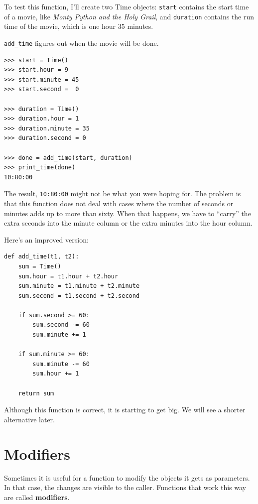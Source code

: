 \documentclass[10pt]{book}
\begin{document}
{

To test this function, I'll create two Time objects: {\tt start}
contains the start time of a movie, like {\em Monty Python and the
Holy Grail}, and {\tt duration} contains the run time of the movie,
which is one hour 35 minutes.


\verb"add_time" figures out when the movie will be done.

\beforeverb
\begin{verbatim}
>>> start = Time()
>>> start.hour = 9
>>> start.minute = 45
>>> start.second =  0

>>> duration = Time()
>>> duration.hour = 1
>>> duration.minute = 35
>>> duration.second = 0

>>> done = add_time(start, duration)
>>> print_time(done)
10:80:00
\end{verbatim}
\afterverb
%
The result, {\tt 10:80:00} might not be what you were hoping
for.  The problem is that this function does not deal with cases where the
number of seconds or minutes adds up to more than sixty.  When that
happens, we have to ``carry'' the extra seconds into the minute column
or the extra minutes into the hour column.


Here's an improved version:

\beforeverb
\begin{verbatim}
def add_time(t1, t2):
    sum = Time()
    sum.hour = t1.hour + t2.hour
    sum.minute = t1.minute + t2.minute
    sum.second = t1.second + t2.second

    if sum.second >= 60:
        sum.second -= 60
        sum.minute += 1

    if sum.minute >= 60:
        sum.minute -= 60
        sum.hour += 1

    return sum
\end{verbatim}
\afterverb
%
Although this function is correct, it is starting to get big.
We will see a shorter alternative later.


\section{Modifiers}
\label{increment}


Sometimes it is useful for a function to modify the objects it gets as
parameters.  In that case, the changes are visible to the caller.
Functions that work this way are called {\bf modifiers}.

}
\end{document}
